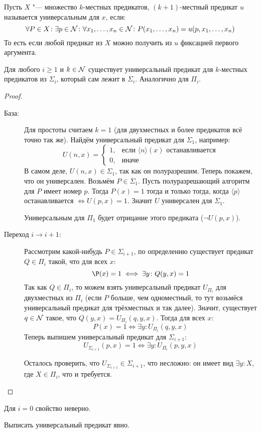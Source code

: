 \item
	\begin{Def}
		Пусть $X$ "--- множество $k$-местных предикатов, $(k+1)$-местный предикат $u$
		называется универсальным для $x$, если:
		\[
		\forall P \in X \colon \exists p \in \mathcal{N} \colon \forall x_1, \dots, x_n \in \mathcal{N} \colon
		P(x_1, \dots, x_n) = u(p, x_1, \dots, x_n)
		\]
		То есть если любой предикат из $X$ можно получить из $u$ фиксацией первого аргумента.
	\end{Def}
	\begin{assertion}
		Для любого $i \ge 1$ и $k \in \mathcal{N}$ существует универсальный предикат для $k$-местных предикатов
		из $\Sigma_i$, который сам лежит в $\Sigma_i$.
		Аналогично для $\Pi_i$.
	\end{assertion}
	\begin{proof}
		\begin{description}
		\item[База:]
			Для простоты считаем $k=1$ (для двухместных и более предикатов всё точно так же).
			Найдём универсальный предикат для $\Sigma_1$, например:
			\[
			U(n, x) =
			\left\{
			\begin{matrix}
			1, &\text{если $\langle n\rangle(x)$ останавливается} \\
			0, &\text{иначе}
			\end{matrix}
			\right.
			\]
			В самом деле, $U(n, x) \in \Sigma_1$, так как он полуразрешим.
			Теперь покажем, что он универсален.
			Возьмём $P\in \Sigma_1$.
			Пусть полуразрешающий алгоритм для $P$ имеет номер $p$.
			Тогда $P(x)=1$ тогда и только тогда, когда $\langle p \rangle$ останавливается $\iff U(p, x)=1$.
			Значит $U$ универсален для $\Sigma_1$.

			Универсальным для $\Pi_1$ будет отрицание этого предиката ($\lnot U(p, x)$).
		\item[Переход $i \to i+1$:]
			Рассмотрим какой-нибудь $P \in \Sigma_{i+1}$, по определению существует предикат $Q \in \Pi_i$ такой, что для всех $x$:
			\[ \P(x) = 1 \iff \exists y \colon Q(y, x) = 1 \]
			Так как $Q \in \Pi_i$, то можем взять универсальный предикат $U_{\Pi_i}$ для двухместных из $\Pi_i$
			(если $P$ больше, чем одноместный, то тут возьмёся универсальный предикат для трёхместных и так далее).
			Значит, существует $q \in \mathcal{N}$ такое, что $Q(y, x) = U_{\Pi_i}(q, y, x)$.
			Тогда для всех $x$:
			\[ P(x) = 1 \iff \exists y \colon U_{\Pi_i}(q, y, x) \]
			Теперь выпишем универсальный предикат для $\Sigma_{i+1}$:
			\[ U_{\Sigma_{i+1}}(p, x) = 1 \iff \exists y \colon U_{\Pi_i}(p, y, x) \]

			Осталось проверить, что $U_{\Sigma_{i+1}} \in \Sigma_{i+1}$, что несложно: он имеет вид $\exists y \colon X$, где $X \in \Pi_i$, что и требуется.
		\end{description}
	\end{proof}
	\begin{Exercise}
		Для $i=0$ свойство неверно.
	\end{Exercise}	
	\begin{Exercise}
		Выписать универсальный предикат явно.
	\end{Exercise}	

